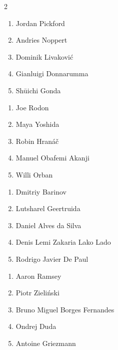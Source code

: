 \documentclass[11pt]{article}
\begin{document}
\begin{multicols}{2}

\begin{samepage}
\begin{tcolorbox}[evalbox,title=\textbf{Manuel Neuer (Goalkeeper)} \hfill Score:\ \rule{1cm}{0.4pt}]
\begin{enumerate}
\item Jordan Pickford
\item Andries Noppert
\item Dominik Livaković
\item Gianluigi Donnarumma
\item Shūichi Gonda
\end{enumerate}
\end{tcolorbox}
\end{samepage}

\begin{samepage}
\begin{tcolorbox}[evalbox,title=\textbf{Virgil van Dijk (Left Center Back)} \hfill Score:\ \rule{1cm}{0.4pt}]
\begin{enumerate}
\item Joe Rodon
\item Maya Yoshida
\item Robin Hranáč
\item Manuel Obafemi Akanji
\item Willi Orban
\end{enumerate}
\end{tcolorbox}
\end{samepage}

\begin{samepage}
\begin{tcolorbox}[evalbox,title=\textbf{Trent Alexander-Arnold (Right Defensive Midfield)} \hfill Score:\ \rule{1cm}{0.4pt}]
\begin{enumerate}
\item Dmitriy Barinov
\item Lutsharel Geertruida
\item Daniel Alves da Silva
\item Denis Lemi Zakaria Lako Lado
\item Rodrigo Javier De Paul
\end{enumerate}
\end{tcolorbox}
\end{samepage}

\begin{samepage}
\begin{tcolorbox}[evalbox,title=\textbf{Kevin De Bruyne (Center Attacking Midfield)} \hfill Score:\ \rule{1cm}{0.4pt}]
\begin{enumerate}
\item Aaron Ramsey
\item Piotr Zieliński
\item Bruno Miguel Borges Fernandes
\item Ondrej Duda
\item Antoine Griezmann
\end{enumerate}
\end{tcolorbox}
\end{samepage}


\end{multicols}
\end{document}
